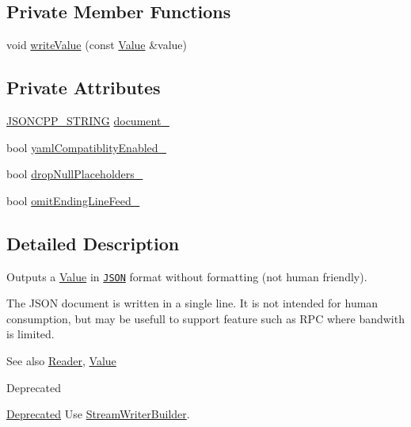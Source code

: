 \subsection*{Private Member Functions}
\begin{DoxyCompactItemize}
\item 
void \hyperlink{classJson_1_1FastWriter_a2ef4a2ce13a341171f01f414f4fdd765}{write\+Value} (const \hyperlink{classJson_1_1Value}{Value} \&value)
\end{DoxyCompactItemize}
\subsection*{Private Attributes}
\begin{DoxyCompactItemize}
\item 
\hyperlink{json_8hpp_a1e723f95759de062585bc4a8fd3fa4be}{J\+S\+O\+N\+C\+P\+P\+\_\+\+S\+T\+R\+I\+NG} \hyperlink{classJson_1_1FastWriter_a5e08c44579db8704dba1ebe37d39fdba}{document\+\_\+}
\item 
bool \hyperlink{classJson_1_1FastWriter_a4c4c1911179bf472d24492915b0e489a}{yaml\+Compatiblity\+Enabled\+\_\+}
\item 
bool \hyperlink{classJson_1_1FastWriter_a97e9d4ff84b59a48756dcc27a71b5904}{drop\+Null\+Placeholders\+\_\+}
\item 
bool \hyperlink{classJson_1_1FastWriter_abd6e13851db6dcf59d84af68d48d50ac}{omit\+Ending\+Line\+Feed\+\_\+}
\end{DoxyCompactItemize}


\subsection{Detailed Description}
Outputs a \hyperlink{classJson_1_1Value}{Value} in \href{http://www.json.org}{\tt J\+S\+ON} format without formatting (not human friendly). 

The J\+S\+ON document is written in a single line. It is not intended for \textquotesingle{}human\textquotesingle{} consumption, but may be usefull to support feature such as R\+PC where bandwith is limited. \begin{DoxySeeAlso}{See also}
\hyperlink{classJson_1_1Reader}{Reader}, \hyperlink{classJson_1_1Value}{Value} 
\end{DoxySeeAlso}
\begin{DoxyRefDesc}{Deprecated}
\item[\hyperlink{deprecated__deprecated000008}{Deprecated}]Use \hyperlink{classJson_1_1StreamWriterBuilder}{Stream\+Writer\+Builder}. \end{DoxyRefDesc}


